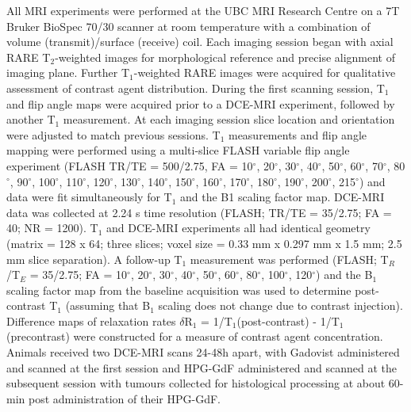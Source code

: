 All MRI experiments were performed at the UBC MRI Research Centre on a 7T Bruker BioSpec 70/30 scanner at room temperature with a combination of volume (transmit)/surface (receive) coil.
Each imaging session began with axial \acs{RARE} T$_2$-weighted images for morphological reference and precise alignment of imaging plane.
Further T$_1$-weighted \acs{RARE} images were acquired for qualitative assessment of contrast agent distribution.
During the first scanning session, T$_1$ and flip angle maps were acquired prior to a DCE-MRI experiment, followed by another T$_1$ measurement.
At each imaging session slice location and orientation were adjusted to match previous sessions.
T$_1$ measurements and flip angle mapping were performed using a multi-slice FLASH variable flip angle experiment (FLASH TR/TE = 500/2.75, FA = 10$^{\circ}$, 20$^{\circ}$, 30$^{\circ}$, 40$^{\circ}$, 50$^{\circ}$, 60$^{\circ}$, 70$^{\circ}$, 80$^{\circ}$, 90$^{\circ}$, 100$^{\circ}$, 110$^{\circ}$, 120$^{\circ}$, 130$^{\circ}$, 140$^{\circ}$, 150$^{\circ}$, 160$^{\circ}$, 170$^{\circ}$, 180$^{\circ}$, 190$^{\circ}$, 200$^{\circ}$, 215$^{\circ}$) and data were fit simultaneously for T$_1$ and the B1 scaling factor map.
\acs{DCE-MRI} data was collected at 2.24 s time resolution (FLASH; TR/TE = 35/2.75; FA = 40; NR = 1200).
T$_1$ and \acs{DCE-MRI} experiments all had identical geometry (matrix = 128 x 64; three slices; voxel size = 0.33 mm x 0.297 mm x 1.5 mm; 2.5 mm slice separation).
A follow-up T$_1$ measurement was performed (FLASH; T$_R$/T$_E$ = 35/2.75; FA = 10$^{\circ}$, 20$^{\circ}$, 30$^{\circ}$, 40$^{\circ}$, 50$^{\circ}$, 60$^{\circ}$, 80$^{\circ}$, 100$^{\circ}$, 120$^{\circ}$) and the B$_1$ scaling factor map from the baseline acquisition was used to determine post-contrast T$_1$ (assuming that B$_1$ scaling does not change due to contrast injection).
Difference maps of relaxation rates $\delta$R$_1$ = 1/T$_1$(post-contrast) - 1/T$_1$(precontrast) were constructed for a measure of contrast agent concentration.
Animals received two DCE-MRI scans 24-48h apart, with Gadovist administered and scanned at the first session and \acs{HPG-GdF} administered and scanned at the subsequent session with tumours collected for histological processing at about 60-min post administration of their \acs{HPG-GdF}.

